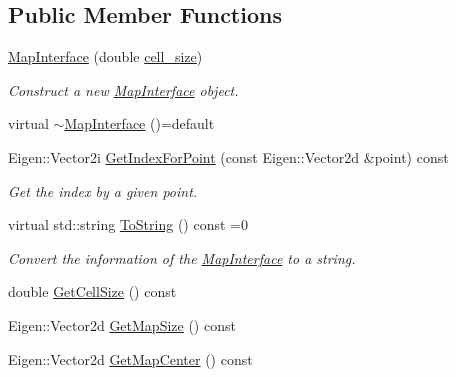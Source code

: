 \subsection*{Public Member Functions}
\begin{DoxyCompactItemize}
\item 
\hyperlink{classMapInterface_a5ecababed14b4918ba90b98eb6b8f6b7}{Map\+Interface} (double \hyperlink{testl__match_8cc_a456553c1fc05d94c07e74c5fd45f6621}{cell\+\_\+size})
\begin{DoxyCompactList}\small\item\em Construct a new \hyperlink{classMapInterface}{Map\+Interface} object. \end{DoxyCompactList}\item 
virtual \hyperlink{classMapInterface_aede896827e92298d459e6d51a2095155}{$\sim$\+Map\+Interface} ()=default
\item 
Eigen\+::\+Vector2i \hyperlink{classMapInterface_abda1b7e35d6af9e42ca698c909ba976b}{Get\+Index\+For\+Point} (const Eigen\+::\+Vector2d \&point) const
\begin{DoxyCompactList}\small\item\em Get the index by a given point. \end{DoxyCompactList}\item 
virtual std\+::string \hyperlink{classMapInterface_a87b132e1a619eb21e0ac684fc25f8c74}{To\+String} () const =0
\begin{DoxyCompactList}\small\item\em Convert the information of the \hyperlink{classMapInterface}{Map\+Interface} to a string. \end{DoxyCompactList}\item 
double \hyperlink{classMapInterface_ade05de8aac815c4e54ffdbc82afa2cbc}{Get\+Cell\+Size} () const
\item 
Eigen\+::\+Vector2d \hyperlink{classMapInterface_acfbb86571ebd3fd0404eb238f5a4d52c}{Get\+Map\+Size} () const
\item 
Eigen\+::\+Vector2d \hyperlink{classMapInterface_ad2ab3f050d776762ff6a3b9d7a6a1bc6}{Get\+Map\+Center} () const
\end{DoxyCompactItemize}
